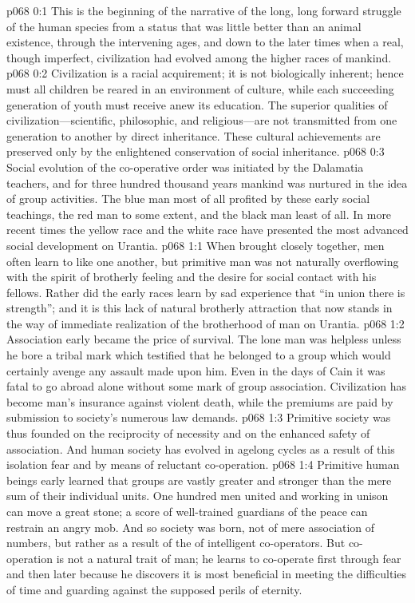 \author{Melchizedek}
\vs p068 0:1 This is the beginning of the narrative of the long, long forward struggle of the human species from a status that was little better than an animal existence, through the intervening ages, and down to the later times when a real, though imperfect, civilization had evolved among the higher races of mankind.
\vs p068 0:2 Civilization is a racial acquirement; it is not biologically inherent; hence must all children be reared in an environment of culture, while each succeeding generation of youth must receive anew its education. The superior qualities of civilization---scientific, philosophic, and religious---are not transmitted from one generation to another by direct inheritance. These cultural achievements are preserved only by the enlightened conservation of social inheritance.
\vs p068 0:3 Social evolution of the co\hyp{}operative order was initiated by the Dalamatia teachers, and for three hundred thousand years mankind was nurtured in the idea of group activities. The blue man most of all profited by these early social teachings, the red man to some extent, and the black man least of all. In more recent times the yellow race and the white race have presented the most advanced social development on Urantia.\plusone
{}
\vs p068 1:1 When brought closely together, men often learn to like one another, but primitive man was not naturally overflowing with the spirit of brotherly feeling and the desire for social contact with his fellows. Rather did the early races learn by sad experience that “in union there is strength”; and it is this lack of natural brotherly attraction that now stands in the way of immediate realization of the brotherhood of man on Urantia.
\vs p068 1:2 Association early became the price of survival. The lone man was helpless unless he bore a tribal mark which testified that he belonged to a group which would certainly avenge any assault made upon him. Even in the days of Cain it was fatal to go abroad alone without some mark of group association. Civilization has become man’s insurance against violent death, while the premiums are paid by submission to society’s numerous law demands.
\vs p068 1:3 Primitive society was thus founded on the reciprocity of necessity and on the enhanced safety of association. And human society has evolved in agelong cycles as a result of this isolation fear and by means of reluctant co\hyp{}operation.
\pc \vs p068 1:4 Primitive human beings early learned that groups are vastly greater and stronger than the mere sum of their individual units. One hundred men united and working in unison can move a great stone; a score of well\hyp{}trained guardians of the peace can restrain an angry mob. And so society was born, not of mere association of numbers, but rather as a result of the  of intelligent co\hyp{}operators. But co\hyp{}operation is not a natural trait of man; he learns to co\hyp{}operate first through fear and then later because he discovers it is most beneficial in meeting the difficulties of time and guarding against the supposed perils of eternity.
